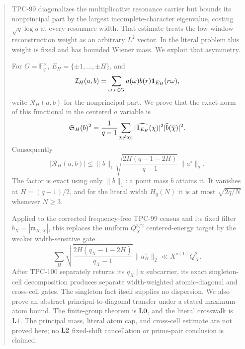 \begin{abstract}
TPC-99 diagonalizes the multiplicative resonance carrier but bounds
its nonprincipal part by the largest incomplete-character
eigenvalue, costing \(\sqrt q\log q\) at every resonance width.
That estimate treats the low-window reconstruction weight as an
arbitrary \(L^2\) vector.  In the literal problem this weight is
fixed and has bounded Wiener mass.  We exploit that asymmetry.

For \(G=\mathbb F_q^\times\),
\(E_H=\{\pm1,\ldots,\pm H\}\), and
\[
 \cI_H(a,b)
 =
 \sum_{\omega,r\in G}
 a(\omega)b(r)\one_{E_H}(r\omega),
\]
write \(\mathcal R_H(a,b)\) for the nonprincipal part.  We prove
that the exact norm of this functional in the centered \(a\)
variable is
\[
 \mathfrak S_H(b)^2
 =
 \frac1{q-1}
 \sum_{\chi\ne\chi_0}
 |\widehat{\one_{E_H}}(\chi)|^2
 |\widehat b(\overline\chi)|^2.
\]
Consequently
\[
 |\mathcal R_H(a,b)|
 \le
 \|b\|_1
 \sqrt{\frac{2H(q-1-2H)}{q-1}}\,
 \|a^\circ\|_2.
\]
The factor is exact using only \(\|b\|_1\): a point mass \(b\)
attains it.  It vanishes at \(H=(q-1)/2\), and for the literal width
\(H_q(N)\) it is at most \(\sqrt{2q/N}\) whenever \(N\ge3\).

Applied to the corrected frequency-free TPC-99 census and its fixed
filter \(b_X=|\mathfrak m_{K,X}|\), this replaces the uniform
\(Q_X^{3/2}\) centered-energy target by the weaker
width-sensitive gate
\[
 \sum_H
 \sqrt{\frac{2H(q_X-1-2H)}{q_X-1}}\,
 \|a_H^\circ\|_2
 \ll X^{o(1)}Q_X^2.
\]
After TPC-100 separately returns its \(q_X\mid u\) subcarrier, its
exact singleton-cell decomposition produces separate
width-weighted atomic-diagonal and cross-cell gates.  The singleton
fact itself supplies no dispersion.  We also prove an
abstract principal-to-diagonal transfer under a stated maximum-atom
bound.  The finite-group theorem is \(\Lzero\), and
the literal crosswalk is \(\Lone\).  The principal mass, literal
atom cap, and cross-cell estimate are not proved here; no
\(\Ltwo\) fixed-shift cancellation or prime-pair conclusion is
claimed.
\end{abstract}
